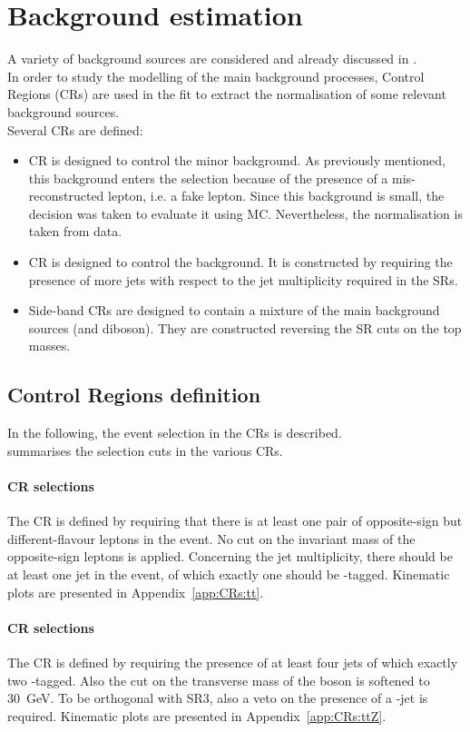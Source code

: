 \section{Background estimation}
\label{sec:background_all}
A variety of background sources are considered and already discussed in .\\
In order to study the modelling of the main background processes, Control Regions (CRs) are used in the fit to extract the normalisation of some relevant background sources.\\
Several CRs are defined:
\begin{itemize}
	\item \ttbar CR is designed to control the minor \ttbar
	background. As previously mentioned, this background enters the
	selection because of the presence of a mis-reconstructed lepton,
	i.e. a fake lepton. Since this background is small, the decision was
	taken to evaluate it using MC. Nevertheless, the normalisation is
	taken from data. 
	\item \ttZ CR is designed to control the \ttZ
	background. It is constructed by requiring the presence of more jets
	with respect to the jet multiplicity required in the SRs.
	\item Side-band CRs are designed to contain a mixture
	of the main background sources (\ttZ and diboson). They are
	constructed reversing the SR cuts on the top masses.
\end{itemize}

\subsection {Control Regions definition}
\label{sec:bkg:sel}
In the following, the event selection in the CRs is described.\\
 summarises the selection cuts in the various CRs.
\paragraph{\ttbar CR selections}
The \ttbar CR is defined by requiring that there is at least one pair
of opposite-sign but different-flavour leptons in the
event. No cut on the invariant mass of the opposite-sign
leptons is applied. Concerning the jet multiplicity, there should be
at least one jet in the event, of which exactly one should be
\Pqb-tagged. Kinematic plots are presented in Appendix~\ref{app:CRs:tt}.

\paragraph{\ttZ CR selections}
\label{sec:bkg:ttz}
The \ttZ CR is defined by requiring the presence of at least four jets
of which exactly two \Pqb-tagged. Also the cut on the transverse
mass of the \PW boson is softened to \SI{30}{\GeV}. To be orthogonal 
with SR3\tZc, also a veto on the presence of a \Pqc-jet is required. 
Kinematic plots are presented in Appendix~\ref{app:CRs:ttZ}.

